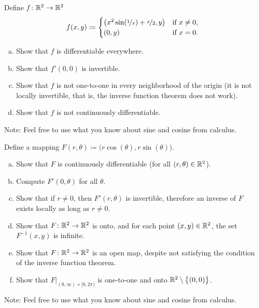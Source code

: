 \begin{samepage}
\begin{exercise}
Define $f \colon {\mathbb{R}}^2 \to {\mathbb{R}}^2$
\begin{equation*}
f(x,y) \coloneqq
\begin{cases}
\bigl(x^2 \sin (\nicefrac{1}{x}) + \nicefrac{x}{2} , y \bigr) &
 \text{if } x \not= 0, \\
(0,y) &
 \text{if } x=0.
\end{cases}
\end{equation*}
\begin{enumerate}[a)]
\item
Show that $f$ is differentiable everywhere.
\item
Show that $f'(0,0)$ is invertible.
\item
Show that $f$ is not one-to-one in every neighborhood of the origin (it is
not locally invertible, that is, the inverse function theorem does not work).
\item
Show that $f$ is not continuously differentiable.
\end{enumerate}
Note: Feel free to use what you know about sine and cosine from calculus.
\end{exercise}
\end{samepage}

\begin{exercise} \label{mv:exercise:polarcoordinates}
Define a mapping $F(r,\theta) \coloneqq \bigl(r \cos(\theta), r \sin(\theta) \bigr)$.
\begin{enumerate}[a)]
\item
Show that $F$ is continuously differentiable (for all $(r,\theta) \in
{\mathbb{R}}^2$).
\item
Compute $F'(0,\theta)$ for all $\theta$.
\item
Show that if $r \not= 0$, then $F'(r,\theta)$ is invertible, therefore an
inverse of $F$ exists locally as long as $r \not= 0$.
\item
Show that $F \colon {\mathbb{R}}^2 \to {\mathbb{R}}^2$ is onto, and for each point $(x,y) \in
{\mathbb{R}}^2$, the set $F^{-1}(x,y)$ is infinite.
\item
Show that $F \colon {\mathbb{R}}^2 \to {\mathbb{R}}^2$ is an open map, despite not satisfying the condition of the
inverse function theorem.
\item
Show that $F|_{(0,\infty) \times [0,2\pi)}$ is one-to-one and onto
${\mathbb{R}}^2 \setminus \bigl\{ (0,0) \bigr\}$.
\end{enumerate}
Note: Feel free to use what you know about sine and cosine from calculus.
\end{exercise}


